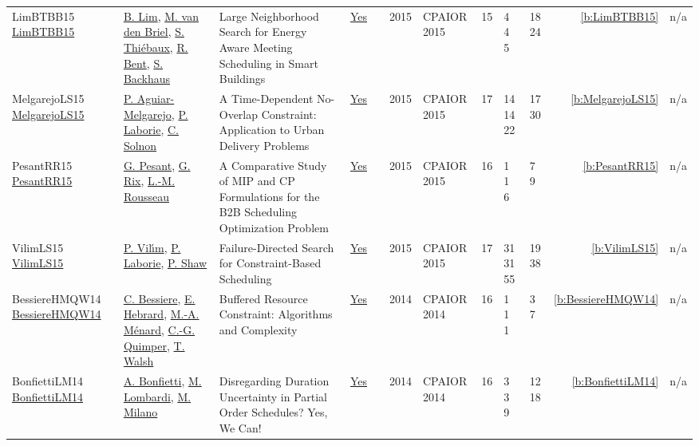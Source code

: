 {\begin{longtable}{>{\raggedright\arraybackslash}p{3cm}>{\raggedright\arraybackslash}p{4.5cm}>{\raggedright\arraybackslash}p{6.0cm}rrrp{2.5cm}rp{1cm}p{1cm}rr}
LimBTBB15 \href{https://doi.org/10.1007/978-3-319-18008-3_17}{LimBTBB15} & \hyperref[auth:a207]{B. Lim}, \hyperref[auth:a210]{M. van den Briel}, \hyperref[auth:a209]{S. Thi{\'{e}}baux}, \hyperref[auth:a1355]{R. Bent}, \hyperref[auth:a1356]{S. Backhaus} & \cellcolor{green!10}Large Neighborhood Search for Energy Aware Meeting Scheduling in Smart Buildings & \href{../works/LimBTBB15.pdf}{Yes} & \cite{LimBTBB15} & 2015 & CPAIOR 2015 & 15 & 4 4 5 & 18 24 & \ref{b:LimBTBB15} & n/a\\
MelgarejoLS15 \href{https://doi.org/10.1007/978-3-319-18008-3_1}{MelgarejoLS15} & \hyperref[auth:a321]{P. Aguiar-Melgarejo}, \hyperref[auth:a118]{P. Laborie}, \hyperref[auth:a85]{C. Solnon} & \cellcolor{green!10}A Time-Dependent No-Overlap Constraint: Application to Urban Delivery Problems & \href{../works/MelgarejoLS15.pdf}{Yes} & \cite{MelgarejoLS15} & 2015 & CPAIOR 2015 & 17 & 14 14 22 & 17 30 & \ref{b:MelgarejoLS15} & n/a\\
PesantRR15 \href{https://doi.org/10.1007/978-3-319-18008-3_21}{PesantRR15} & \hyperref[auth:a8]{G. Pesant}, \hyperref[auth:a325]{G. Rix}, \hyperref[auth:a326]{L.-M. Rousseau} & A Comparative Study of {MIP} and {CP} Formulations for the {B2B} Scheduling Optimization Problem & \href{../works/PesantRR15.pdf}{Yes} & \cite{PesantRR15} & 2015 & CPAIOR 2015 & 16 & 1 1 6 & 7 9 & \ref{b:PesantRR15} & n/a\\
VilimLS15 \href{https://doi.org/10.1007/978-3-319-18008-3_30}{VilimLS15} & \hyperref[auth:a121]{P. Vil{\'{\i}}m}, \hyperref[auth:a118]{P. Laborie}, \hyperref[auth:a120]{P. Shaw} & Failure-Directed Search for Constraint-Based Scheduling & \href{../works/VilimLS15.pdf}{Yes} & \cite{VilimLS15} & 2015 & CPAIOR 2015 & 17 & 31 31 55 & 19 38 & \ref{b:VilimLS15} & n/a\\
BessiereHMQW14 \href{https://doi.org/10.1007/978-3-319-07046-9_23}{BessiereHMQW14} & \hyperref[auth:a328]{C. Bessiere}, \hyperref[auth:a1]{E. Hebrard}, \hyperref[auth:a329]{M.-A. M{\'{e}}nard}, \hyperref[auth:a37]{C.-G. Quimper}, \hyperref[auth:a276]{T. Walsh} & \cellcolor{green!10}Buffered Resource Constraint: Algorithms and Complexity & \href{../works/BessiereHMQW14.pdf}{Yes} & \cite{BessiereHMQW14} & 2014 & CPAIOR 2014 & 16 & 1 1 1 & 3 7 & \ref{b:BessiereHMQW14} & n/a\\
BonfiettiLM14 \href{https://doi.org/10.1007/978-3-319-07046-9_15}{BonfiettiLM14} & \hyperref[auth:a198]{A. Bonfietti}, \hyperref[auth:a142]{M. Lombardi}, \hyperref[auth:a143]{M. Milano} & Disregarding Duration Uncertainty in Partial Order Schedules? Yes, We Can! & \href{../works/BonfiettiLM14.pdf}{Yes} & \cite{BonfiettiLM14} & 2014 & CPAIOR 2014 & 16 & 3 3 9 & 12 18 & \ref{b:BonfiettiLM14} & n/a\\

\end{longtable}}

